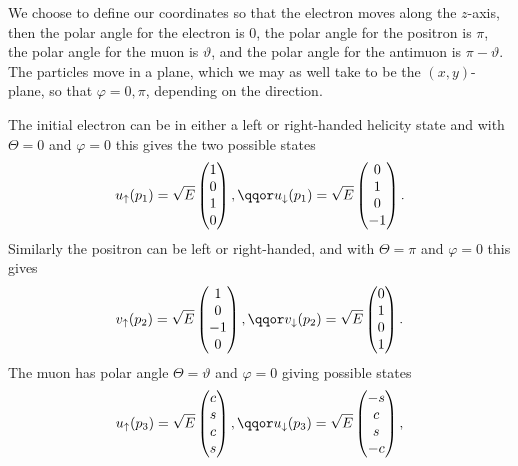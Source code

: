 \documentclass[fleqn]{NotesClass}
\begin{document}
    We choose to define our coordinates so that the electron moves along the \(z\)-axis, then the polar angle for the electron is \(0\), the polar angle for the positron is \(\pi\), the polar angle for the muon is \(\vartheta\), and the polar angle for the antimuon is \(\pi - \vartheta\).
    The particles move in a plane, which we may as well take to be the \((x,y)\)-plane, so that \(\varphi = 0, \pi\), depending on the direction.
    
    The initial electron can be in either a left or right-handed helicity state and with \(\Theta = 0\) and \(\varphi = 0\) this gives the two possible states
    \begin{equation}
        u_{\uparrow}(p_1) = \sqrt{E}
        \begin{pmatrix}
            1\\ 0\\ 1\\ 0
        \end{pmatrix}
        , \qqor u_{\downarrow}(p_1) = \sqrt{E}
        \begin{pmatrix}
            0\\ 1\\ 0\\ -1
        \end{pmatrix}
        .
    \end{equation}
    Similarly the positron can be left or right-handed, and with \(\Theta = \pi\) and \(\varphi = 0\) this gives
    \begin{equation}
        v_{\uparrow}(p_2) = \sqrt{E}
        \begin{pmatrix}
            1\\ 0\\ -1\\ 0
        \end{pmatrix}
        , \qqor v_{\downarrow}(p_2) = \sqrt{E}
        \begin{pmatrix}
            0\\ 1\\ 0\\ 1
        \end{pmatrix}
        .
    \end{equation}
    The muon has polar angle \(\Theta = \vartheta\) and \(\varphi = 0\) giving possible states
    \begin{equation}
        u_{\uparrow}(p_3) = \sqrt{E}
        \begin{pmatrix}
            c\\ s\\ c\\ s
        \end{pmatrix}
        , \qqor u_{\downarrow}(p_3) = \sqrt{E}
        \begin{pmatrix}
            -s\\ c\\ s\\ -c
        \end{pmatrix}
        ,
    \end{equation}
\end{document}
